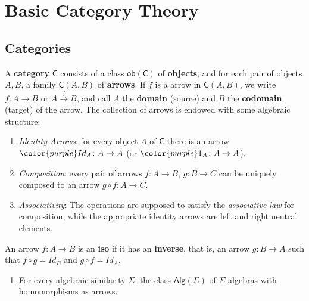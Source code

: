 
\section{Basic Category Theory}


\subsection{Categories}


\begin{df}[Categories]
	A \textbf{category} $\mathsf{C}$ consists of a class {\color{purple} $\mathsf{ob(C)}$} of \textbf{objects}, 
	and for each pair of objects $A,B$, 
	a family {\color{purple} $\mathsf{C}(A,B)$} of \textbf{arrows}.
	If $f$ is a arrow in $\mathsf{C}(A,B)$, 
	we write {\color{red} $f \colon A \to B$} or {\color{red} $A \xrightarrow{f} B$}, 
	and call $A$ the \textbf{domain} (source) and $B$ the \textbf{codomain} (target) of the arrow.
	The collection of arrows is endowed with some algebraic structure:
    \begin{enumerate}[label=(\arabic*)]
        \item \textit{Identity Arrows}: for every object $A$ of $\mathsf{C}$ there is an arrow ${\color{purple} Id_A} \colon A \to A$ (or ${\color{purple} 1_A} \colon A \to A$).
        
        \item \textit{Composition}: every pair of arrows $f \colon A \to B$, 
        $g \colon B \to C$ can be uniquely composed to an arrow $g \circ f \colon A \to C$.

        \item \textit{Associativity}: The operations are supposed to satisfy the \textit{associative law} for composition, 
        while the appropriate identity arrows are left and right neutral elements.
    \end{enumerate}

	An arrow $f \colon A \to B$ is an \textbf{iso} if it has an \textbf{inverse}, 
	that is, an arrow $g \colon B \to A$ such that 
	$f \circ g =Id_B$ and $g \circ f = Id_A$.
\end{df}



\begin{example}
	\begin{enumerate}
		\item For every algebraic similarity $\Sigma$, 
		the class $\mathsf{Alg}(\Sigma)$ of $\Sigma$-algebras with homomorphisms as arrows.
	\end{enumerate}
\end{example}





